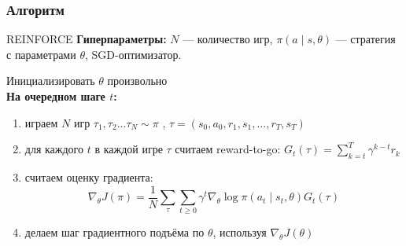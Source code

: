 \documentclass[notheorems]{beamer} %
\begin{document}
\begin{frame}
	\frametitle{Алгоритм}
\begin{block}{REINFORCE}
	\textbf{Гиперпараметры:} $N$ --- количество игр, $\pi(a \mid s, \theta)$ --- стратегия с параметрами $\theta$, SGD-оптимизатор.
	
	\vspace{0.3cm}
	Инициализировать $\theta$ произвольно \\
	\textbf{На очередном шаге $t$:}
	\begin{enumerate}
		\item играем $N$ игр $\tau_1, \tau_2 \dots \tau_N \sim \pi$ , $\tau = (s_0, a_0,  r_1, s_1, \dots, r_T, s_T)$
		
		\item для каждого $t$ в каждой игре $\tau$ считаем reward-to-go: $G_t(\tau )= \sum_{k = t}^{T} \gamma^{k - t} r_{k}$
		\item считаем оценку градиента:
		$$\nabla_\theta J(\pi) =\frac{1}{N}\sum_{\tau} \sum_{t \ge 0} \gamma^t \nabla_\theta \log \pi(a_t \mid s_t, \theta) G_t(\tau ) $$
		\item делаем шаг градиентного подъёма по $\theta$, используя $\nabla_\theta J(\theta)$
	\end{enumerate}
\end{block}

\end{frame}
\end{document}
